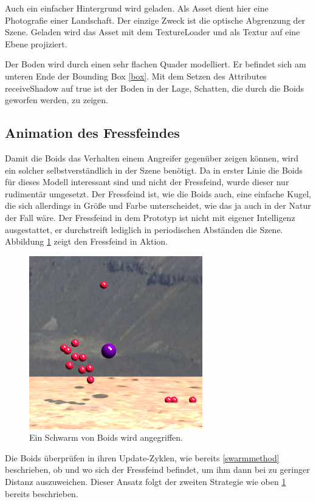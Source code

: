 \documentclass[draft=false
              ,paper=a4
              ,twoside=false
              ,fontsize=11pt
              ,headsepline
              ,BCOR10mm
              ,DIV11
              ,bibtotoc
              ,liststotoc
              ]{scrbook}
\begin{document}
Auch ein einfacher Hintergrund wird geladen. Als Asset dient hier eine Photografie einer Landschaft. Der einzige Zweck ist die optische Abgrenzung der Szene. Geladen wird das Asset mit dem TextureLoader und als Textur auf eine Ebene projiziert.

Der Boden wird durch einen sehr flachen Quader modelliert. Er befindet sich am unteren Ende der Bounding Box \ref{box}. Mit dem Setzen des Attributes receiveShadow auf true ist der Boden in der Lage, Schatten, die durch die Boids geworfen werden, zu zeigen.

\subsection{Animation des Fressfeindes}
Damit die Boids das Verhalten einem Angreifer gegenüber zeigen können, wird ein solcher selbstverständlich in der Szene benötigt. Da in erster Linie die Boids für dieses Modell interessant sind und nicht der Fressfeind, wurde dieser nur rudimentär umgesetzt. Der Fressfeind ist, wie die Boids auch, eine einfache Kugel, die sich allerdings in Größe und Farbe unterscheidet, wie das ja auch in der Natur der Fall wäre. Der Fressfeind in dem Prototyp ist nicht mit eigener Intelligenz ausgestattet, er durchstreift lediglich in periodischen Abständen die Szene. Abbildung \ref{enemy} zeigt den Fressfeind in Aktion.

\begin{figure}[!h]
\centering
\includegraphics[scale=0.8]{project/enemy.png}
\caption{Ein Schwarm von Boids wird angegriffen.}
\label{enemy}
\end{figure}

Die Boids überprüfen in ihren Update-Zyklen, wie bereits \ref{swarmmethod} beschrieben, ob und wo sich der Fressfeind befindet, um ihm dann bei zu geringer Distanz auszuweichen. Dieser Ansatz folgt der zweiten Strategie wie oben \ref{enemy} bereits beschrieben.
\end{document}

